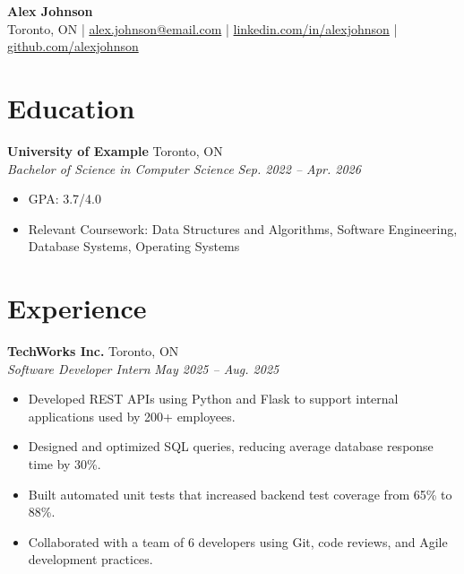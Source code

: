 \documentclass[11pt,letterpaper]{article}
\newcommand{\resumeHeading}[4]{
    \begin{center}
        {\Large \textbf{#1}} \\[3pt]
        #2 \;|\; #3 \;|\; #4
    \end{center}
    \vspace{-6pt}
}
\newcommand{\resumeEntry}[4]{
    \textbf{#1} \hfill #2 \\
    \textit{#3} \hfill \textit{#4}
}
\begin{document}

\resumeHeading
    {Alex Johnson}
    {Toronto, ON}
    {\href{mailto:alex.johnson@email.com}{alex.johnson@email.com}}
    {\href{https://linkedin.com/in/alexjohnson}{linkedin.com/in/alexjohnson}
    \;|\;
    \href{https://github.com/alexjohnson}{github.com/alexjohnson}}


\section{Education}

\resumeEntry
    {University of Example}
    {Toronto, ON}
    {Bachelor of Science in Computer Science}
    {Sep. 2022 -- Apr. 2026}

\begin{itemize}
    \item GPA: 3.7/4.0
    \item Relevant Coursework: Data Structures and Algorithms, Software Engineering, Database Systems, Operating Systems
\end{itemize}


\section{Experience}

\resumeEntry
    {TechWorks Inc.}
    {Toronto, ON}
    {Software Developer Intern}
    {May 2025 -- Aug. 2025}

\begin{itemize}
    \item Developed REST APIs using Python and Flask to support internal applications used by 200+ employees.
    \item Designed and optimized SQL queries, reducing average database response time by 30\%.
    \item Built automated unit tests that increased backend test coverage from 65\% to 88\%.
    \item Collaborated with a team of 6 developers using Git, code reviews, and Agile development practices.
\end{itemize}
\end{document}
